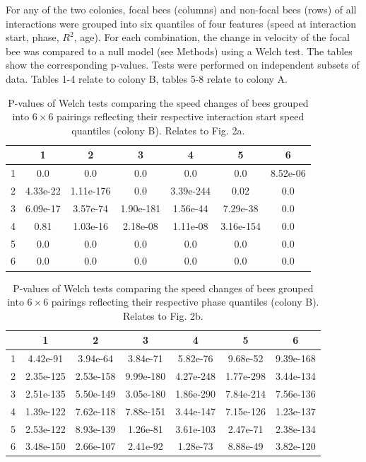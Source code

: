 \documentclass{article}
\begin{document}
For any of the two colonies, focal bees (columns) and non-focal bees (rows) of all interactions were grouped into six quantiles of four features (speed at interaction start, phase, $R^2$, age). For each combination, the change in velocity of the focal bee was compared to a null model (see Methods) using a Welch test. The tables show the corresponding p-values. Tests were performed on independent subsets of data. Tables 1-4 relate to colony B, tables 5-8 relate to colony A.

\begin{table}[h!]
\centering
\def\tablename{Supplementary Table}
\caption{
P-values of Welch tests comparing the speed changes of bees grouped into $6 \times 6$ pairings reflecting their respective interaction start speed quantiles (colony B). Relates to Fig. 2a.  
}
\begin{tabular}{|c|c|c|c|c|c|c|}
\hline
 & 1 & 2 & 3 & 4 & 5 & 6 \\ \hline
1 & 0.0 & 0.0 & 0.0 & 0.0 & 0.0 & 8.52e-06 \\ \hline
2 & 4.33e-22 & 1.11e-176 & 0.0 & 3.39e-244 & 0.02 & 0.0 \\ \hline
3 & 6.09e-17 & 3.57e-74 & 1.90e-181 & 1.56e-44 & 7.29e-38 & 0.0 \\ \hline
4 & 0.81 & 1.03e-16 & 2.18e-08 & 1.11e-08 & 3.16e-154 & 0.0 \\ \hline
5 & 0.0 & 0.0 & 0.0 & 0.0 & 0.0 & 0.0 \\ \hline
6 & 0.0 & 0.0 & 0.0 & 0.0 & 0.0 & 0.0 \\ \hline
\end{tabular}
\end{table}


\begin{table}[h!]
\centering
\def\tablename{Supplementary Table}
\caption{
P-values of Welch tests comparing the speed changes of bees grouped into $6 \times 6$ pairings reflecting their respective phase quantiles (colony B). Relates to Fig. 2b. 
}
\begin{tabular}{|c|c|c|c|c|c|c|}
\hline
 & 1 & 2 & 3 & 4 & 5 & 6 \\ \hline
1 & 4.42e-91 & 3.94e-64 & 3.84e-71 & 5.82e-76 & 9.68e-52 & 9.39e-168 \\ \hline
2 & 2.35e-125 & 2.53e-158 & 9.99e-180 & 4.27e-248 & 1.77e-298 & 3.44e-134 \\ \hline
3 & 2.51e-135 & 5.50e-149 & 3.05e-180 & 1.86e-290 & 7.84e-214 & 7.56e-136 \\ \hline
4 & 1.39e-122 & 7.62e-118 & 7.88e-151 & 3.44e-147 & 7.15e-126 & 1.23e-137 \\ \hline
5 & 2.53e-122 & 8.93e-139 & 1.26e-81 & 3.61e-103 & 2.47e-71 & 2.38e-134 \\ \hline
6 & 3.48e-150 & 2.66e-107 & 2.41e-92 & 1.28e-73 & 8.88e-49 & 3.82e-120 \\ \hline
\end{tabular}
\end{table}
\end{document}
